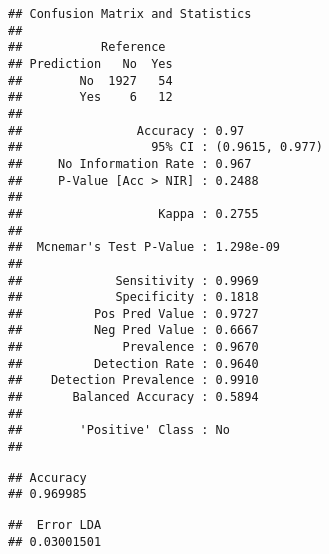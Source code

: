 \documentclass[]{book}
\newenvironment{Shaded}{\begin{snugshade}}{\end{snugshade}}
\newcommand{\CommentTok}[1]{\textcolor[rgb]{0.56,0.35,0.01}{\textit{#1}}}
\newcommand{\DataTypeTok}[1]{\textcolor[rgb]{0.13,0.29,0.53}{#1}}
\newcommand{\DecValTok}[1]{\textcolor[rgb]{0.00,0.00,0.81}{#1}}
\newcommand{\KeywordTok}[1]{\textcolor[rgb]{0.13,0.29,0.53}{\textbf{#1}}}
\newcommand{\NormalTok}[1]{#1}
\newcommand{\OperatorTok}[1]{\textcolor[rgb]{0.81,0.36,0.00}{\textbf{#1}}}
\newcommand{\StringTok}[1]{\textcolor[rgb]{0.31,0.60,0.02}{#1}}
\begin{document}
\begin{verbatim}
## Confusion Matrix and Statistics
## 
##           Reference
## Prediction   No  Yes
##        No  1927   54
##        Yes    6   12
##                                          
##                Accuracy : 0.97           
##                  95% CI : (0.9615, 0.977)
##     No Information Rate : 0.967          
##     P-Value [Acc > NIR] : 0.2488         
##                                          
##                   Kappa : 0.2755         
##                                          
##  Mcnemar's Test P-Value : 1.298e-09      
##                                          
##             Sensitivity : 0.9969         
##             Specificity : 0.1818         
##          Pos Pred Value : 0.9727         
##          Neg Pred Value : 0.6667         
##              Prevalence : 0.9670         
##          Detection Rate : 0.9640         
##    Detection Prevalence : 0.9910         
##       Balanced Accuracy : 0.5894         
##                                          
##        'Positive' Class : No             
## 
\end{verbatim}

\begin{Shaded}
\end{Shaded}

\begin{verbatim}
## Accuracy 
## 0.969985
\end{verbatim}

\begin{Shaded}
\end{Shaded}

\begin{verbatim}
##  Error LDA 
## 0.03001501
\end{verbatim}
\end{document}
